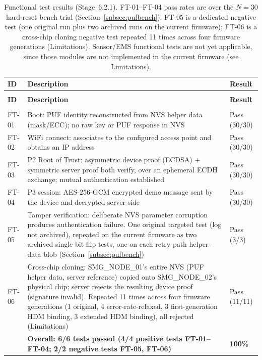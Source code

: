 \documentclass[preprint,12pt,authoryear]{elsarticle}
\begin{document}
\begingroup
\small
\renewcommand{\arraystretch}{1.15}
\begin{longtable}{
    >{\centering\arraybackslash}p{1.9cm}
    >{\raggedright\arraybackslash}p{9.0cm}
    >{\centering\arraybackslash}p{1.4cm}
}
    \caption{Functional test results (Stage~6.2.1). FT-01--FT-04 pass rates are over the $N=30$ hard-reset bench trial (Section~\ref{subsec:pufbench}); FT-05 is a dedicated negative test (one original run plus two archived runs on the current firmware); FT-06 is a cross-chip cloning negative test repeated 11 times across four firmware generations (Limitations). Sensor/EMS functional tests are not yet applicable, since those modules are not implemented in the current firmware (see Limitations).}
    \label{tab:functional} \\
    \toprule
    \textbf{ID} & \textbf{Description} & \textbf{Result} \\
    \midrule
    \endfirsthead
    \multicolumn{3}{l}{\small\textit{Table~\ref{tab:functional} continued from previous page}} \\
    \toprule
    \textbf{ID} & \textbf{Description} & \textbf{Result} \\
    \midrule
    \endhead
    \midrule
    \multicolumn{3}{r}{\small\textit{continued on next page}} \\
    \endfoot
    \bottomrule
    \endlastfoot
        FT-01 & Boot: PUF identity reconstructed from NVS helper data (mask/ECC); no raw key or PUF response in NVS & Pass (30/30) \\
        FT-02 & WiFi connect: associates to the configured access point and obtains an IP address & Pass (30/30) \\
        FT-03 & P2 Root of Trust: asymmetric device proof (ECDSA) + symmetric server proof both verify, over an ephemeral ECDH exchange; mutual authentication established & Pass (30/30) \\
        FT-04 & P3 session: AES-256-GCM encrypted demo message sent by the device and decrypted server-side & Pass (30/30) \\
        FT-05 & Tamper verification: deliberate NVS parameter corruption produces authentication failure. One original targeted test (log not archived), repeated on the current firmware as two archived single-bit-flip tests, one on each retry-path helper-data blob (Section~\ref{subsec:pufbench}) & Pass (3/3) \\
        FT-06 & Cross-chip cloning: SMG\_NODE\_01's entire NVS (PUF helper data, server reference) copied onto SMG\_NODE\_02's physical chip; server rejects the resulting device proof (signature invalid). Repeated 11 times across four firmware generations (1 original, 4 error-rate-relaxed, 3 first-generation HDM binding, 3 extended HDM binding), all rejected (Limitations) & Pass (11/11) \\
        \midrule
        & \textbf{Overall: 6/6 tests passed (4/4 positive tests FT-01--FT-04; 2/2 negative tests FT-05, FT-06)} & \textbf{100\%} \\
\end{longtable}
\endgroup
\end{document}
